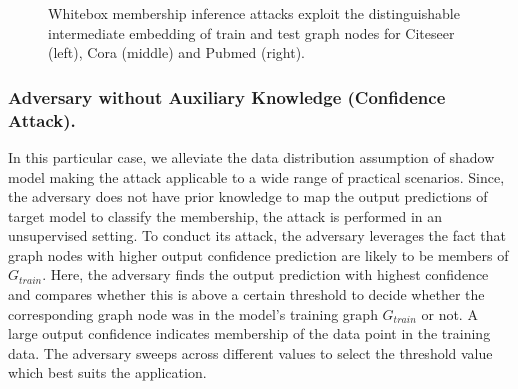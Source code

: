 \begin{figure}[!htb]
\centering
{}
\caption{Whitebox membership inference attacks exploit the distinguishable intermediate embedding of train and test graph nodes for Citeseer (left), Cora (middle) and Pubmed (right).}
\label{embedding}
\end{figure}



\noindent\subsubsection{Adversary without Auxiliary Knowledge (Confidence Attack).} In this particular case, we alleviate the data distribution assumption of shadow model making the attack applicable to a wide range of practical scenarios.
Since, the adversary does not have prior knowledge to map the output predictions of target model to classify the membership, the attack is performed in an unsupervised setting.%
To conduct its attack, the adversary leverages the fact that graph nodes with higher output confidence prediction are likely to be members of $G_{train}$.
Here, the adversary finds the output prediction with highest confidence and compares whether this is above a certain threshold to decide whether the corresponding graph node was in the model's training graph $G_{train}$ or not.
A large output confidence indicates membership of the data point in the training data.
The adversary sweeps across different values to select the threshold value which best suits the application.





